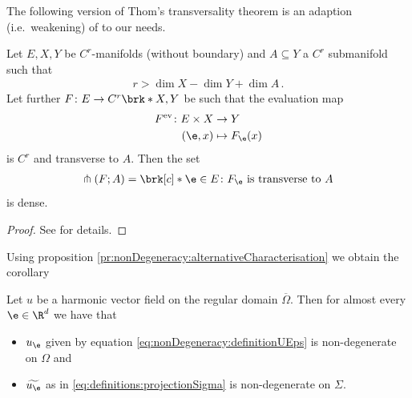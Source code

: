 The following version of Thom's transversality theorem is an adaption (i.e.\ weakening) of \cite[Theorem 2.7]{Hirsch1994} to our needs.
\begin{theorem}
  Let $E,X,Y$ be $C^r$-manifolds (without boundary) and $A\subseteq Y$ a $C^r$ submanifold such that
  \begin{align*}
    r>\dim X-\dim Y+\dim A\,.
  \end{align*}
  Let further $F\colon E\to C^r\brk*{X,Y}$ be such that the evaluation map
  \begin{align*}
    F^\text{ev}\colon E\times X&\to Y \\
    (\e,x)&\mapsto F_\e(x)
  \end{align*}
  is $C^r$ and transverse to $A$.
  Then the set
  \begin{align*}
    \pitchfork(F;A)=\brk[c]*{\e\in E\colon F_\e\text{ is transverse to } A}
  \end{align*}
  is dense.
\end{theorem}
\begin{proof}
  See \cite[Threorem 2.7]{Hirsch1994} for details.
\end{proof}
Using proposition \ref{pr:nonDegeneracy:alternativeCharacterisation} we obtain the corollary
\begin{corollary}
  Let $u$ be a harmonic vector field on the regular domain $\overline{\Omega}$.
  Then for almost every $\e\in\R^d$ we have that
  \begin{itemize}
    \item $u_\e$ given by equation \eqref{eq:nonDegeneracy:definitionUEps} is non-degenerate on $\Omega$ and
    \item $\widetilde{u_\e}$ as in \eqref{eq:definitions:projectionSigma} is non-degenerate on $\Sigma$.
  \end{itemize}
\end{corollary}
